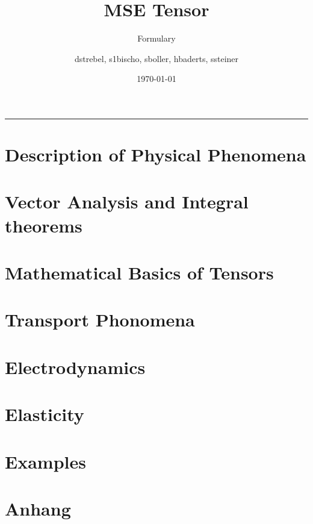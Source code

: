 \documentclass[a4paper, 10pt]{scrartcl}
\title{MSE Tensor}
\subtitle{Formulary}
\author{dstrebel, s1bischo, sboller, hbaderts, ssteiner}
\date{\today}
\begin{document}
	\maketitle 

	\setlength{\parskip}{0cm}
	\setcounter{tocdepth}{1}	
	
	\tableofcontents 	
	
	\smallskip 
	\rule{\textwidth}{0.5pt}
	\smallskip



	\section{Description of Physical Phenomena}
			
		
		\newpage
	\section{Vector Analysis and Integral theorems}
		
	\section{Mathematical Basics of Tensors}
	
	\newpage
	\section{Transport Phonomena}
	
	\newpage
	\section{Electrodynamics}
		
		\newpage
	\section{Elasticity}
   		

	\section{Examples}
%	
	\section{Anhang}
	
		
\end{document}
